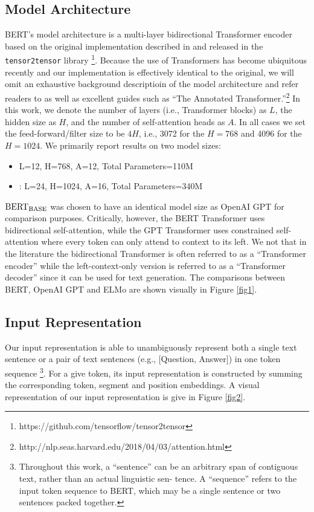 	\subsection {Model Architecture} \label{sec3.1}
	BERT's model architecture is a multi-layer bidirectional Transformer encoder based on the original implementation described in \citep{Ashish2017} and released in the \texttt{tensor2tensor} library \footnote{https://github.com/tensorflow/tensor2tensor}. Because the use of Transformers has become ubiquitous recently and our implementation is effectively identical to the original, we will omit an exhaustive background descriptioin of the model architecture and refer readers to \citet{Ashish2017} as well as excellent guides such as ``The Annotated Transformer.''\footnote{http://nlp.seas.harvard.edu/2018/04/03/attention.html}
	In this work, we denote the number of layers (i.e., Transformer blocks) as $L$, the hidden size as $H$, and the number of self-attention heads as $A$. In all cases we set the feed-forward/filter size to be $4H$, i.e., 3072 for the $H = 768$ and 4096 for the $H = 1024$. We primarily report results on two model sizes:
	\begin{itemize}
		\item {} L=12, H=768, A=12, Total Parameters=110M %
		\item {}: L=24, H=1024, A=16, Total Parameters=340M
	\end{itemize}
	$\rm BERT_{BASE}$ was chosen to have an identical model size as OpenAI GPT for comparison purposes. Critically, however, the BERT Transformer uses bidirectional self-attention, while the GPT Transformer uses constrained self-attention where every token can only attend to context to its left. We not that in the literature the bidirectional Transformer is often referred to as a ``Transformer encoder'' while the left-context-only version is referred to as a ``Transformer decoder'' since it can be used for text generation. The comparisons between BERT, OpenAI GPT and ELMo are shown visually in Figure \ref{fig1}.
	
	\subsection {Input Representation} \label{sec3.2}
	Our input representation is able to unambiguously represent both a single text sentence or a pair of text sentences (e.g., [Question, Answer]) in one token sequence \footnote{Throughout this work, a “sentence” can be an arbitrary span of contiguous text, rather than an actual linguistic sen- tence. A “sequence” refers to the input token sequence to BERT, which may be a single sentence or two sentences packed together.}. For a give token, its input representation is constructed by summing the corresponding token, segment and position embeddings. A visual representation of our input representation is give in Figure \ref{fig2}.
	
